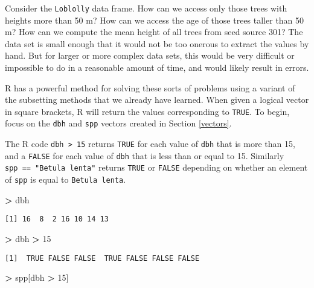 \documentclass[]{krantz}
\makeatletter
\newenvironment{Shaded}{\begin{snugshade}}{\end{snugshade}}
\newcommand{\DecValTok}[1]{\textcolor[rgb]{0.06,0.06,0.06}{#1}}
\newcommand{\StringTok}[1]{\textcolor[rgb]{0.5,0.5,0.5}{#1}}
\newcommand{\OperatorTok}[1]{\textcolor[rgb]{0.43,0.43,0.43}{\textbf{#1}}}
\newcommand{\NormalTok}[1]{#1}
\newenvironment{kframe}{%
\medskip{}
\setlength{\fboxsep}{.8em}
 \def\at@end@of@kframe{}%
 \ifinner\ifhmode%
  \def\at@end@of@kframe{\end{minipage}}%
  \begin{minipage}{\columnwidth}%
 \fi\fi%
 \def\FrameCommand##1{\hskip\@totalleftmargin \hskip-\fboxsep
 \colorbox{shadecolor}{##1}\hskip-\fboxsep
     \hskip-\linewidth \hskip-\@totalleftmargin \hskip\columnwidth}%
 \MakeFramed {\advance\hsize-\width
   \@totalleftmargin\z@ \linewidth\hsize
   \@setminipage}}%
 {\par\unskip\endMakeFramed%
 \at@end@of@kframe}
\renewenvironment{Shaded}{\begin{kframe}}{\end{kframe}}
\theoremstyle{definition}
\theoremstyle{definition}
\theoremstyle{definition}
\theoremstyle{remark}
\makeatother
\begin{document}
Consider the \texttt{Loblolly} data frame. How can we access only those
trees with heights more than 50 m? How can we access the age of those
trees taller than 50 m? How can we compute the mean height of all trees
from seed source 301? The data set is small enough that it would not be
too onerous to extract the values by hand. But for larger or more
complex data sets, this would be very difficult or impossible to do in a
reasonable amount of time, and would likely result in errors.

R has a powerful method for solving these sorts of problems using a
variant of the subsetting methods that we already have learned. When
given a logical vector in square brackets, R will return the values
corresponding to \texttt{TRUE}. To begin, focus on the \texttt{dbh} and
\texttt{spp} vectors created in Section \ref{vectors}.

The R code \texttt{dbh\ \textgreater{}\ 15} returns \texttt{TRUE} for
each value of \texttt{dbh} that is more than 15, and a \texttt{FALSE}
for each value of \texttt{dbh} that is less than or equal to 15.
Similarly \texttt{spp\ ==\ "Betula\ lenta"} returns \texttt{TRUE} or
\texttt{FALSE} depending on whether an element of \texttt{spp} is equal
to \texttt{Betula\ lenta}.

\begin{Shaded}
\begin{Highlighting}[]
\OperatorTok{>}\StringTok{ }\NormalTok{dbh}
\end{Highlighting}
\end{Shaded}

\begin{verbatim}
[1] 16  8  2 16 10 14 13
\end{verbatim}

\begin{Shaded}
\begin{Highlighting}[]
\OperatorTok{>}\StringTok{ }\NormalTok{dbh }\OperatorTok{>}\StringTok{ }\DecValTok{15}
\end{Highlighting}
\end{Shaded}

\begin{verbatim}
[1]  TRUE FALSE FALSE  TRUE FALSE FALSE FALSE
\end{verbatim}

\begin{Shaded}
\begin{Highlighting}[]
\OperatorTok{>}\StringTok{ }\NormalTok{spp[dbh }\OperatorTok{>}\StringTok{ }\DecValTok{15}\NormalTok{]}
\end{Highlighting}
\end{Shaded}
\end{document}
